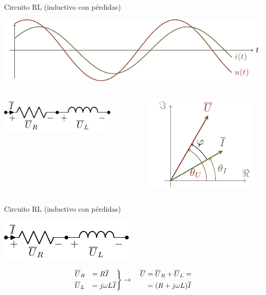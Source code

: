 \documentclass[aspectratio=169, usenames,svgnames,dvipsnames]{beamer}
\begin{document}
\begin{frame}[label={sec:org57d30c1}]{Circuito RL (inductivo con pérdidas)}
\begin{center}
\includegraphics[height=0.25\textheight]{../figs/inductivo.pdf}
\end{center}
\begin{columns}
\begin{column}{0.45\columnwidth}
\begin{center}
\includegraphics[width=0.8\textwidth]{../figs/RL.pdf}
\end{center}
\end{column}
\begin{column}{0.55\columnwidth}
\begin{center}
\includegraphics[height=0.5\textheight]{../figs/fasorInductanciaReal_VI.pdf}
\end{center}
\end{column}
\end{columns}
\end{frame}
\begin{frame}[label={sec:org257b83e}]{Circuito RL (inductivo con pérdidas)}
\begin{center}
\includegraphics[height=0.2\textheight]{../figs/RL.pdf}
\end{center}

\[
\begin{rcases}
  \overline{U}_R &= R \overline{I}\\
  \overline{U}_L &= j\omega L \overline{I}
\end{rcases} \rightarrow \quad
    \begin{aligned}
      \overline{U} &= \overline{U}_R + \overline{U}_L =\\
		   &=(R + j\omega L) \overline{I}
    \end{aligned}
\]
\end{frame}
\end{document}
